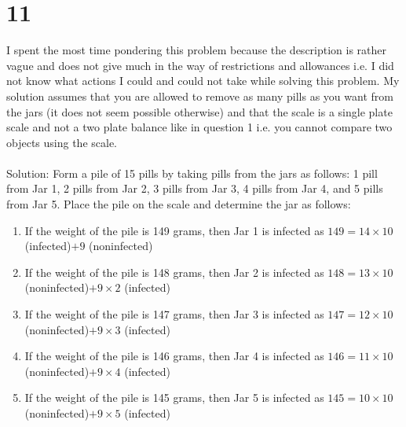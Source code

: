 \documentclass[letterpaper,notitlepage,twoside]{article}
\begin{document}
\section*{11}
I spent the most time pondering this problem because the description is rather vague and does not give much in the way of restrictions and allowances i.e. I did not know what actions I could and could not take while solving this problem. My solution assumes that you are allowed to remove as many pills as you want from the jars (it does not seem possible otherwise) and that the scale is a single plate scale and not a two plate balance like in question 1 i.e. you cannot compare two objects using the scale. \\
\\
Solution: Form a pile of 15 pills by taking pills from the jars as follows: 1 pill from Jar 1, 2 pills from Jar 2, 3 pills from Jar 3, 4 pills from Jar 4, and 5 pills from Jar 5. Place the pile on the scale and determine the jar as follows: \\
\begin{enumerate}
\item If the weight of the pile is 149 grams, then Jar 1 is infected as $149 = 14 \times 10$ (infected)$ + 9$ (noninfected)
\item If the weight of the pile is 148 grams, then Jar 2 is infected as $148 = 13 \times 10$ (noninfected)$ + 9 \times 2$ (infected)
\item If the weight of the pile is 147 grams, then Jar 3 is infected as $147 = 12 \times 10$ (noninfected)$ + 9 \times 3$ (infected)
\item If the weight of the pile is 146 grams, then Jar 4 is infected as $146 = 11 \times 10$ (noninfected)$ + 9 \times 4$ (infected)
\item If the weight of the pile is 145 grams, then Jar 5 is infected as $145 = 10 \times 10$ (noninfected)$ + 9 \times 5$ (infected)
\end{enumerate}
\end{document}
